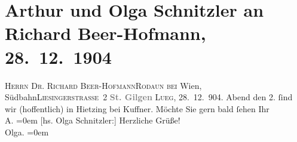 

         
         \renewcommand{\erwaehntePersonen}{Personen: Richard Beer-Hofmann, Olga Schnitzler}
         \renewcommand{\erwaehnteInstitutionen}{Institutionen: Südbahnstrecke}
         \renewcommand{\erwaehnteOrte}{Orte: Liesingerstraße, Ottakringer Bräu, Rodaun, St. Gilgen, Wien, XIII., Hietzing}
         \renewcommand{\erwaehnteWerke}{}
               \section[Arthur und Olga Schnitzler an Richard Beer-Hofmann, 28. 12. 1904]{ Arthur und Olga Schnitzler an Richard Beer-Hofmann,
               28. 12. 1904}\nopagebreak{}\rehead{ }\begin{ledgroupsized}[t]{13cm}\normalsize\beginnumbering \toendnotes[C]{\smallbreak\pagebreak[2]} 
\toendnotes[C]{\smallbreak}\pstart{}{\pb}\textsc{Herrn Dr. Richard Beer-Hofmann}\pend{}\pstart{}\textsc{Rodaun}{ }\introOben{}\textsc{bei}{ }Wien, Südbahn\introOben{}\pend{}\pstart{}\textsc{Liesingerstraße 2}\pend{}{\bigskip}\pstart
           \noindent{}\centering{}\textcolor{gray}{\textbf{{\pb}St. Gilgen}}\pend
           \pstart
           \textsc{Lueg}, 28. 12. 904.\pend
           \pstart
           \label{K_L01484-1v}\label{K_L01484-1h}{ }Abend den 2. ſind wir (hoffentlich) in Hietzing bei Kuffner. Möchte
               Sie gern bald ſehen\pend
           \pstart
           Ihr{\\[\baselineskip]}\spacefill\mbox{A.}\pend
           \leftskip=0em{}\pstart
           {[}hs. Olga Schnitzler:{]} Herzliche Grüße! {\\[\baselineskip]}\spacefill\mbox{Olga.}\pend
           \leftskip=0em{}
         
         \endnumbering{}\end{ledgroupsized}  \newcommand{\dateiname}{L01484}\newcommand{\titel}{Arthur und Olga Schnitzler an Richard Beer-Hofmann, 28. 12. 1904}\newcommand{\editorInnen}{Martin Anton Müller und Gerd-Hermann Susen}
      